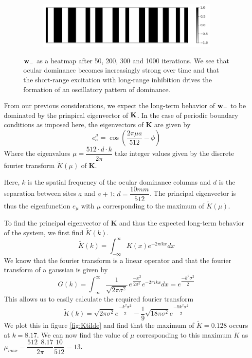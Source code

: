 \documentclass{article}
\begin{document}
\begin{figure}[h]
\begin{subfigure}[t]{0.49\linewidth}
		\centering
		\includegraphics[width = 1.0\linewidth, trim={0 0 0 0}, clip=true]{figures/occsim_int/i1000.png}
	\end{subfigure}%
\caption{${\bf w}_-$ as a heatmap after 50, 200, 300 and 1000 iterations. We see that ocular dominance becomes increasingly strong over time and that the short-range excitation with long-range inhibition drives the formation of an oscillatory pattern of dominance.}
\label{fig:occsim_int}
\end{figure}

From our previous considerations, we expect the long-term behavior of ${\bf w}_-$ to be dominated by the prinpical eigenvector of $\bf K$.
In the case of periodic boundary conditions as imposed here, the eigenvectors of \textbf{K} are given by
\begin{equation}
e_a^\mu = \cos{(\dfrac{2 \pi \mu a}{512}-\phi)}
\end{equation}
Where the eigenvalues $\mu = \dfrac{512 \cdot d \cdot k}{2 \pi}$ take integer values given by the discrete fourier transform $\tilde K(\mu) $ of \textbf{K}.

Here, $k$ is the spatial frequency of the ocular dominance columns and $d$ is the separation between sites $a$ and $a+1$; $d = \dfrac{10 mm}{512}$. The principal eigenvector is thus the eigenfunction $e_\mu$ with $\mu$ corresponding to the maximum of $\tilde K(\mu)$.

To find the principal eigenvector of \textbf{K} and thus the expected long-term behavior of the system, we first find $\tilde K(k)$.
\begin{equation}
\tilde K (k) = \int_{-\infty}^\infty{K(x) e^{-2 \pi i k x} dx }
\end{equation}
We know that the fourier transform is a linear operator and that the fourier transform of a gaussian is given by
\begin{equation}
G(k) = \int_{-\infty}^\infty{ \dfrac{1}{\sqrt{2 \pi \sigma^2}} \, e^{\dfrac{-x^2}{2 \sigma^2}} e^{-2 \pi i k x} dx } 
= e^{\dfrac{-k^2 \sigma^2}{2}}
\end{equation}
This allows us to easily calculate the required fourier transform
\begin{equation}
\tilde K(k) = \sqrt{2 \pi \sigma^2} e^{ \dfrac{- k^2 \sigma^2}{2} } - \dfrac{1}{9} \sqrt{18 \pi \sigma^2 } e^{\dfrac{-9 k^2 \sigma^2}{2}}
\end{equation}
We plot this in figure \ref{fig:Ktilde} and find that the maximum of $\tilde K = 0.128$ occurs at $k = 8.17$. We can now find the value of $\mu$ corresponding to this maximum $\tilde K$ as
$
\mu_{max} = \dfrac{512 \,\,\, 8.17}{2 \pi} \dfrac{10}{512} = 13
$.
\end{document}
